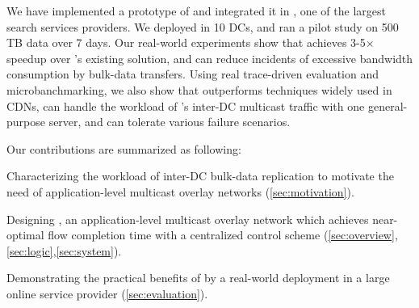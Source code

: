 We have implemented a prototype of \name and integrated it in
\company, one of the largest search services providers.
We deployed \name in 10 DCs, and ran a pilot study on 500 TB
data over 7 days.
Our real-world experiments show that \name achieves 3-5$\times$
speedup over \company's existing solution, and can reduce
incidents of excessive bandwidth consumption by bulk-data
transfers.
Using real trace-driven evaluation and microbanchmarking,
we also show that \name outperforms techniques widely used in
CDNs, can handle the workload of \company's
inter-DC multicast traffic with one general-purpose server,
and can tolerate various failure scenarios.


Our contributions are summarized as following:
\begin{packeditemize}
\item Characterizing the workload of inter-DC bulk-data
replication to motivate the need of application-level
multicast overlay networks (\Section\ref{sec:motivation}).
\item Designing \name, an application-level
multicast overlay network which achieves near-optimal flow completion
time with a centralized control scheme (\Section\ref{sec:overview},\ref{sec:logic},\ref{sec:system}).
\item Demonstrating the practical benefits of \name by a real-world
 deployment in a large online service provider (\Section\ref{sec:evaluation}).
\end{packeditemize}
